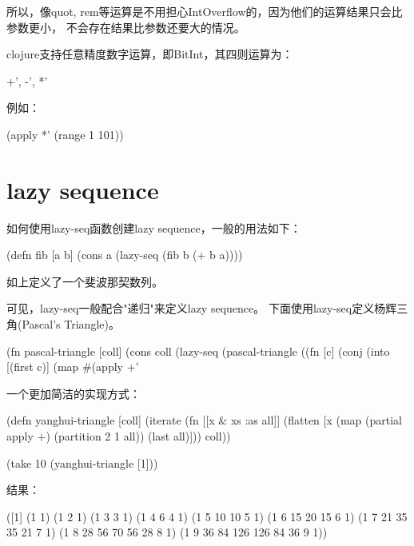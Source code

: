 \documentclass[a4paper,11pt]{article}
\begin{document}
  所以，像quot, rem等运算是不用担心IntOverflow的，因为他们的运算结果只会比参数更小，
  不会存在结果比参数还要大的情况。

  clojure支持任意精度数字运算，即BitInt，其四则运算为：\par
  \begin{schemecode}
    +', -', *'
  \end{schemecode}

  例如：\par
  \begin{schemecode}
    (apply *' (range 1 101))
  \end{schemecode}

  \section[lazy sequence]{lazy sequence}
  如何使用lazy-seq函数创建lazy sequence，一般的用法如下：\par
  \begin{schemecode}
    (defn fib
      [a b]
      (cons a (lazy-seq (fib b (+ b a))))
  \end{schemecode}

  如上定义了一个斐波那契数列。

  可见，lazy-seq一般配合"递归"来定义lazy sequence。
  下面使用lazy-seq定义杨辉三角(Pascal's Triangle)。

  \begin{schemecode}
(fn pascal-triangle
  [coll]
  (cons coll (lazy-seq (pascal-triangle ((fn [c]
        (conj (into [(first c)]
          (map #(apply +' %
  \end{schemecode}

  一个更加简洁的实现方式：\par
  \begin{schemecode}
(defn yanghui-triangle
  [coll]
  (iterate
   (fn [[x & xs :as all]]
     (flatten
      [x (map (partial apply +)
              (partition 2 1 all)) (last all)]))
   coll))

(take 10 (yanghui-triangle [1]))
  \end{schemecode}

  结果：\par
  \begin{schemecode}
([1]
 (1 1)
 (1 2 1)
 (1 3 3 1)
 (1 4 6 4 1)
 (1 5 10 10 5 1)
 (1 6 15 20 15 6 1)
 (1 7 21 35 35 21 7 1)
 (1 8 28 56 70 56 28 8 1)
 (1 9 36 84 126 126 84 36 9 1))
  \end{schemecode}
\end{document}
